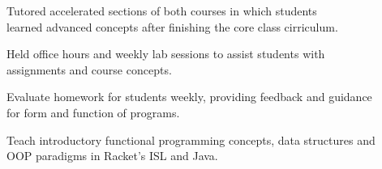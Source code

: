 \documentclass[letterpaper]{deedy-resume} %
\begin{document}
\begin{minipage}[t]{0.66\textwidth}
\vspace{\topsep} %
\begin{tightitemize}

\item Tutored accelerated sections of both courses in which students \\
learned advanced concepts after finishing the core class cirriculum.
\item Held office hours and weekly lab sessions to assist students with \\
assignments and course concepts.
\item Evaluate homework for students weekly, providing feedback and guidance \\
for form and function of programs.
\item Teach introductory functional programming concepts, data structures and \\
OOP paradigms in Racket's ISL and Java.

\end{tightitemize}                                                 

\sectionspace %

\end{minipage} %
\end{document}
